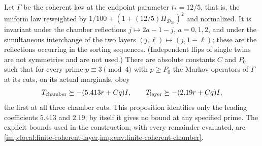 \begin{proposition}
\label{imp:local:coherent-39}
Let $\Gamma$ be the coherent law at the endpoint parameter
$t_*=12/5$, that is, the uniform law reweighted by
$1/100+(1+(12/5)H_{\mathcal D_{39}})^2$ and normalized. It is
invariant under the chamber reflections
$j\mapsto2a-1-j$, $a=0,1,2$, and under the simultaneous
interchange of the two layers $(j,\ell)\mapsto(j,1-\ell)$; these
are the reflections occurring in the sorting sequences.
(Independent flips of single twins are not symmetries and are not
used.) There are absolute constants $C$ and $P_0$ such that for every
prime $p\equiv3\pmod4$ with $p\ge P_0$ the Markov operators
of $\Gamma$ at its cuts, on its actual marginals, obey
\begin{equation}\label{eq:merge-local-I-31}
 T_{\rm chamber}\succeq-(5.413r+Cq)I,\qquad
 T_{\rm layer}\succeq-(2.19r+Cq)I,
\end{equation}
the first at all three chamber cuts. This proposition identifies
only the leading coefficients $5.413$ and $2.19$; by itself it
gives no bound at any specified prime. The explicit bounds used
in the construction, with every remainder evaluated, are
\cref{imp:local:finite-coherent-layer,imp:env:finite-coherent-chamber}.
\end{proposition}

